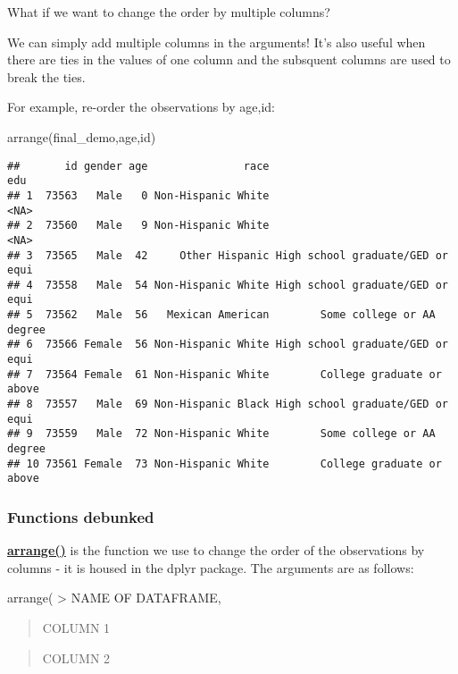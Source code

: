 \documentclass[
]{book}
\newenvironment{Shaded}{\begin{snugshade}}{\end{snugshade}}
\newcommand{\FunctionTok}[1]{\textcolor[rgb]{0.00,0.00,0.00}{#1}}
\newcommand{\NormalTok}[1]{#1}
\begin{document}
What if we want to change the order by multiple columns?

We can simply add multiple columns in the arguments! It's also useful when there are ties in the values of one column and the subsquent columns are used to break the ties.

For example, re-order the observations by age,id:

\begin{Shaded}
\begin{Highlighting}[]
\FunctionTok{arrange}\NormalTok{(final\_demo,age,id)}
\end{Highlighting}
\end{Shaded}

\begin{verbatim}
##       id gender age               race                              edu
## 1  73563   Male   0 Non-Hispanic White                             <NA>
## 2  73560   Male   9 Non-Hispanic White                             <NA>
## 3  73565   Male  42     Other Hispanic High school graduate/GED or equi
## 4  73558   Male  54 Non-Hispanic White High school graduate/GED or equi
## 5  73562   Male  56   Mexican American        Some college or AA degree
## 6  73566 Female  56 Non-Hispanic White High school graduate/GED or equi
## 7  73564 Female  61 Non-Hispanic White        College graduate or above
## 8  73557   Male  69 Non-Hispanic Black High school graduate/GED or equi
## 9  73559   Male  72 Non-Hispanic White        Some college or AA degree
## 10 73561 Female  73 Non-Hispanic White        College graduate or above
\end{verbatim}

\hypertarget{functions-debunked-13}{%
\subsubsection{Functions debunked}\label{functions-debunked-13}}

\href{https://www.rdocumentation.org/packages/dplyr/versions/0.7.8/topics/arrange}{\textbf{arrange()}} is the function we use to change the order of the observations by columns - it is housed in the dplyr package. The arguments are as follows:

arrange(
\textgreater{} NAME OF DATAFRAME,

\begin{quote}
COLUMN 1
\end{quote}

\begin{quote}
COLUMN 2
\end{quote}
\end{document}
